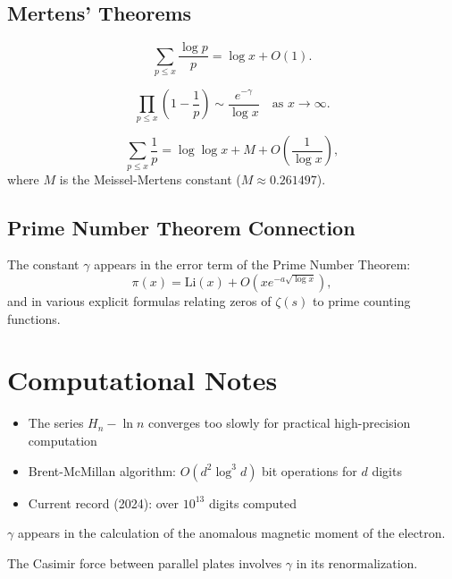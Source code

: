 \subsection{Mertens' Theorems}

\begin{theorem}
\[
\sum_{p \leq x} \frac{\log p}{p} = \log x + O(1).
\]
\end{theorem}

\begin{theorem}
\[
\prod_{p \leq x} \left(1 - \frac{1}{p}\right) \sim \frac{e^{-\gamma}}{\log x} \quad \text{as } x \to \infty.
\]
\end{theorem}

\begin{theorem}
\[
\sum_{p \leq x} \frac{1}{p} = \log\log x + M + O\left(\frac{1}{\log x}\right),
\]
where $M$ is the Meissel-Mertens constant ($M \approx 0.261497$).
\end{theorem}

\subsection{Prime Number Theorem Connection}

The constant $\gamma$ appears in the error term of the Prime Number Theorem:
\[
\pi(x) = \text{Li}(x) + O\left(x e^{-a\sqrt{\log x}}\right),
\]
and in various explicit formulas relating zeros of $\zeta(s)$ to prime counting functions.

\section{Computational Notes}

\begin{itemize}
    \item The series $H_n - \ln n$ converges too slowly for practical high-precision computation
    \item Brent-McMillan algorithm: $O(d^2 \log^3 d)$ bit operations for $d$ digits
    \item Current record (2024): over $10^{13}$ digits computed
\end{itemize}

\begin{remark}
$\gamma$ appears in the calculation of the anomalous magnetic moment of the electron.
\end{remark}

\begin{remark}
The Casimir force between parallel plates involves $\gamma$ in its renormalization.
\end{remark}
